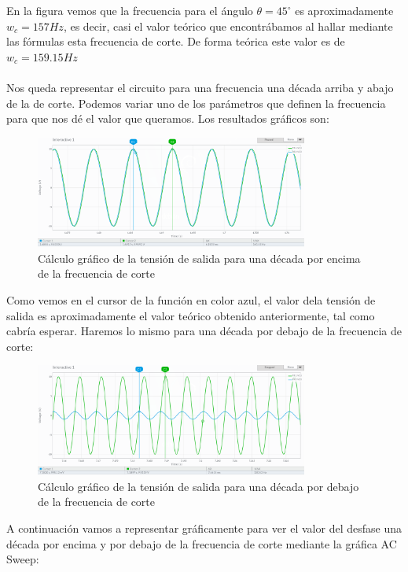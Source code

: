 \documentclass[11pt,letterpaper]{article}
\begin{document}
En la figura vemos que la frecuencia para el ángulo $\theta=45^\circ$ es aproximadamente $w_c=157 Hz$, es decir, casi el valor teórico que encontrábamos al hallar mediante las fórmulas esta frecuencia de corte. De forma teórica este valor es de $w_c=159.15 Hz$\\
\\
Nos queda representar el circuito para una frecuencia una década arriba y abajo de la de corte. Podemos variar uno de los parámetros que definen la frecuencia para que nos dé el valor que queramos. Los resultados gráficos son:
\begin{figure}[H]
	\centering
	\includegraphics[width=0.8\textwidth]{imagen/decadaarriba.png}
	\caption{Cálculo gráfico de la tensión de salida para una década por encima de la frecuencia de corte}
	\label{fig:imagen-decadaarriba-png}
\end{figure}
Como vemos en el cursor de la función en color azul, el valor dela tensión de salida es aproximadamente el valor teórico obtenido anteriormente, tal como cabría esperar. Haremos lo mismo para una década por debajo de la frecuencia de corte:
\begin{figure}[H]
	\centering
	\includegraphics[width=0.8\textwidth]{imagen/decadaabajo.png}
	\caption{Cálculo gráfico de la tensión de salida para una década por debajo de la frecuencia de corte}
	\label{fig:}
\end{figure}
A continuación vamos a representar gráficamente para ver el valor del desfase una década por encima y por debajo de la frecuencia de corte mediante la gráfica AC Sweep:
\end{document}
